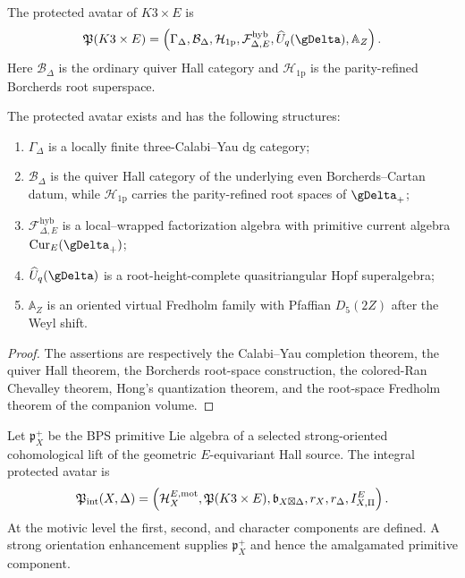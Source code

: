 \begin{definition}
The protected avatar of $K3\times E$ is
\[
 \mathfrak P(K3\times E)=
 \left(
 \Gamma_\Delta,
 \mathcal B_\Delta,
 \mathcal H_{\mathrm{1p}},
 \mathcal F^{\mathrm{hyb}}_{\Delta,E},
 \widehat U_q(\gDelta),
 \mathbb A_Z
 \right).
\]
Here $\mathcal B_\Delta$ is the ordinary quiver Hall category and $\mathcal H_{\mathrm{1p}}$ is the parity-refined Borcherds root superspace.
\end{definition}

\begin{theorem}
The protected avatar exists and has the following structures:
\begin{enumerate}
\item $\Gamma_\Delta$ is a locally finite three-Calabi--Yau dg category;
\item $\mathcal B_\Delta$ is the quiver Hall category of the underlying even Borcherds--Cartan datum, while $\mathcal H_{\mathrm{1p}}$ carries the parity-refined root spaces of $\gDelta_+$;
\item $\mathcal F^{\mathrm{hyb}}_{\Delta,E}$ is a local--wrapped factorization algebra with primitive current algebra $\Cur_E(\gDelta_+)$;
\item $\widehat U_q(\gDelta)$ is a root-height-complete quasitriangular Hopf superalgebra;
\item $\mathbb A_Z$ is an oriented virtual Fredholm family with Pfaffian $D_5(2Z)$ after the Weyl shift.
\end{enumerate}
\end{theorem}
\begin{proof}
The assertions are respectively the Calabi--Yau completion theorem, the quiver Hall theorem, the Borcherds root-space construction, the colored-Ran Chevalley theorem, Hong's quantization theorem, and the root-space Fredholm theorem of the companion volume.
\end{proof}

\begin{definition}
Let $\mathfrak p_X^+$ be the BPS primitive Lie algebra of a selected strong-oriented cohomological lift of the geometric $E$-equivariant Hall source.  The integral protected avatar is
\[
 \mathfrak P_{\mathrm{int}}(X,\Delta)
 =\left(
   \mathcal H_X^{E,\mathrm{mot}},
   \mathfrak P(K3\times E),
   \mathfrak b_{X\boxtimes\Delta},
   r_X,r_\Delta,
   I_{X,\Pi}^E
 \right).
\]
At the motivic level the first, second, and character components are defined.  A strong orientation enhancement supplies $\mathfrak p_X^+$ and hence the amalgamated primitive component.
\end{definition}

